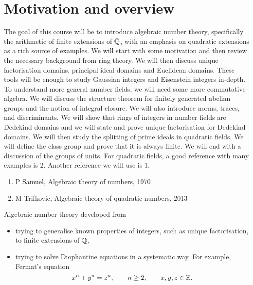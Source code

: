 \def\module{M3P15 Algebraic Number Theory}
\def\lecturer{Dr Ana Caraiani}
\def\term{Spring 2019}

\def\thm{section}







\section{Motivation and overview}


The goal of this course will be to introduce algebraic number theory, specifically the arithmetic of finite extensions of $ \mathbb{Q} $, with an emphasis on quadratic extensions as a rich source of examples. We will start with some motivation and then review the necessary background from ring theory. We will then discuss unique factorisation domains, principal ideal domains and Euclidean domains. These tools will be enough to study Gaussian integers and Eisenstein integers in-depth. To understand more general number fields, we will need some more commutative algebra. We will discuss the structure theorem for finitely generated abelian groups and the notion of integral closure. We will also introduce norms, traces, and discriminants. We will show that rings of integers in number fields are Dedekind domains and we will state and prove unique factorisation for Dedekind domains. We will then study the splitting of prime ideals in quadratic fields. We will define the class group and prove that it is always finite. We will end with a discussion of the groups of units. For quadratic fields, a good reference with many examples is $ 2 $. Another reference we will use is $ 1 $.
\begin{enumerate}
\item P Samuel, Algebraic theory of numbers, 1970
\item M Trifkovic, Algebraic theory of quadratic numbers, 2013
\end{enumerate}

Algebraic number theory developed from
\begin{itemize}
\item trying to generalise known properties of integers, such as unique factorisation, to finite extensions of $ \mathbb{Q} $,
\item trying to solve Diophantine equations in a systematic way. For example, Fermat's equation
$$ x^n + y^n = z^n, \qquad n \ge 2, \qquad x, y, z \in \mathbb{Z}. $$
\end{itemize}

